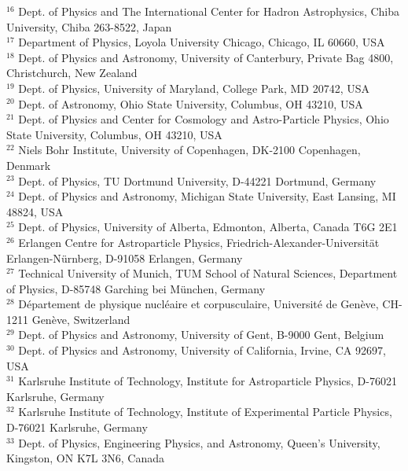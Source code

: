 $^{16}$ Dept. of Physics and The International Center for Hadron Astrophysics, Chiba University, Chiba 263-8522, Japan \\
$^{17}$ Department of Physics, Loyola University Chicago, Chicago, IL 60660, USA \\
$^{18}$ Dept. of Physics and Astronomy, University of Canterbury, Private Bag 4800, Christchurch, New Zealand \\
$^{19}$ Dept. of Physics, University of Maryland, College Park, MD 20742, USA \\
$^{20}$ Dept. of Astronomy, Ohio State University, Columbus, OH 43210, USA \\
$^{21}$ Dept. of Physics and Center for Cosmology and Astro-Particle Physics, Ohio State University, Columbus, OH 43210, USA \\
$^{22}$ Niels Bohr Institute, University of Copenhagen, DK-2100 Copenhagen, Denmark \\
$^{23}$ Dept. of Physics, TU Dortmund University, D-44221 Dortmund, Germany \\
$^{24}$ Dept. of Physics and Astronomy, Michigan State University, East Lansing, MI 48824, USA \\
$^{25}$ Dept. of Physics, University of Alberta, Edmonton, Alberta, Canada T6G 2E1 \\
$^{26}$ Erlangen Centre for Astroparticle Physics, Friedrich-Alexander-Universit{\"a}t Erlangen-N{\"u}rnberg, D-91058 Erlangen, Germany \\
$^{27}$ Technical University of Munich, TUM School of Natural Sciences, Department of Physics, D-85748 Garching bei M{\"u}nchen, Germany \\
$^{28}$ D{\'e}partement de physique nucl{\'e}aire et corpusculaire, Universit{\'e} de Gen{\`e}ve, CH-1211 Gen{\`e}ve, Switzerland \\
$^{29}$ Dept. of Physics and Astronomy, University of Gent, B-9000 Gent, Belgium \\
$^{30}$ Dept. of Physics and Astronomy, University of California, Irvine, CA 92697, USA \\
$^{31}$ Karlsruhe Institute of Technology, Institute for Astroparticle Physics, D-76021 Karlsruhe, Germany  \\
$^{32}$ Karlsruhe Institute of Technology, Institute of Experimental Particle Physics, D-76021 Karlsruhe, Germany  \\
$^{33}$ Dept. of Physics, Engineering Physics, and Astronomy, Queen's University, Kingston, ON K7L 3N6, Canada \\
